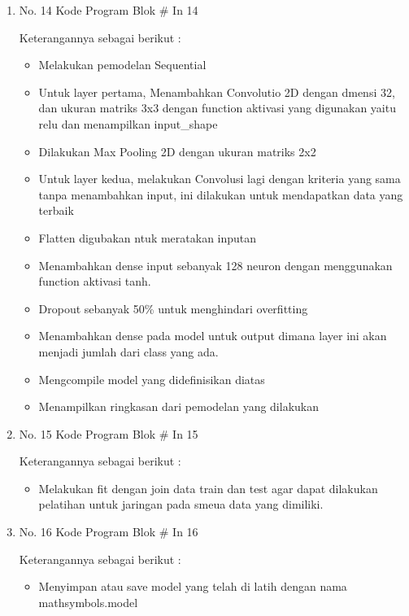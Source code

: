 \begin{enumerate}
\item No. 14 Kode Program Blok \# In 14
\par 
Keterangannya sebagai berikut :
\begin{itemize}
\item Melakukan pemodelan Sequential
\item Untuk layer pertama, Menambahkan Convolutio 2D dengan dmensi 32, dan ukuran matriks 3x3 dengan function aktivasi yang digunakan yaitu relu dan menampilkan input\_shape
\item Dilakukan Max Pooling 2D dengan ukuran matriks 2x2
\item Untuk layer kedua, melakukan Convolusi lagi dengan kriteria yang sama tanpa menambahkan input, ini dilakukan untuk mendapatkan data yang terbaik
\item Flatten digubakan ntuk meratakan inputan
\item Menambahkan dense input sebanyak 128 neuron dengan menggunakan function aktivasi tanh.
\item Dropout sebanyak 50\% untuk menghindari overfitting
\item Menambahkan dense pada model untuk output dimana layer ini akan menjadi jumlah dari class yang ada.
\item Mengcompile model yang didefinisikan diatas
\item Menampilkan ringkasan dari pemodelan yang dilakukan
\end{itemize}

\item No. 15 Kode Program Blok \# In 15
\par 
Keterangannya sebagai berikut :
\begin{itemize}
\item Melakukan fit dengan join data train dan test agar dapat dilakukan pelatihan untuk jaringan pada smeua data yang dimiliki.
\end{itemize}

\item No. 16 Kode Program Blok \# In 16
\par 
Keterangannya sebagai berikut :
\begin{itemize}
\item Menyimpan atau save model yang telah di latih dengan nama mathsymbols.model 
\end{itemize}


\end{enumerate}
